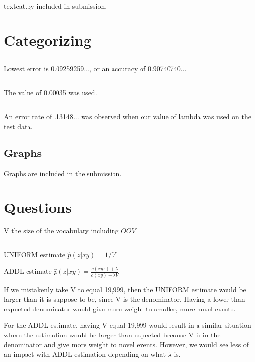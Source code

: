 \documentclass[12pt, letterpaper]{article}
\begin{document}
textcat.py included in submission.

\section{Categorizing}

\subsection{}

Lowest error is 0.09259259..., or an accuracy of 0.90740740...

\subsection{}

The value of 0.00035 was used.

\subsection{}

An error rate of .13148... was observed when our value of lambda was used on the test data.

\subsection{Graphs}
Graphs are included in the submission. 

\section{Questions}

V the size of the vocabulary including $OOV$

\subsection{}

UNIFORM estimate $\hat{p}(z | xy) = 1 / V$

ADDL estimate $\hat{p}(z | xy) = \frac{c(xyz) + \lambda}{c(xy) + \lambda V}$

If we mistakenly take V to equal 19,999, then the UNIFORM estimate would be larger than it is suppose to be, since V is the denominator. Having a lower-than-expected denominator would give more weight to smaller, more novel events.

For the ADDL estimate, having V equal 19,999 would result in a similar situation where the estimation would be larger than expected because V is in the denominator and give more weight to novel events. However, we would see less of an impact with ADDL estimation depending on what $\lambda$ is. 
\end{document}
